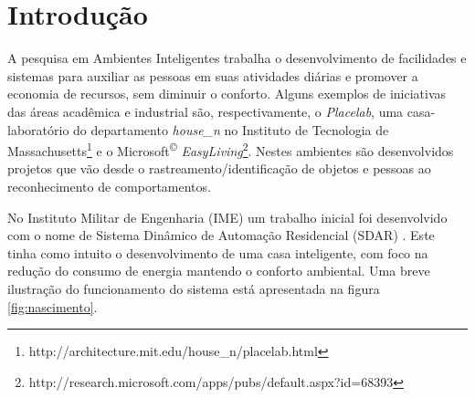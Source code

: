 \newpage

\section{Introdução} \label{intro}

A pesquisa em Ambientes Inteligentes trabalha o desenvolvimento de facilidades e sistemas para  auxiliar as pessoas em suas atividades diárias e promover a economia de recursos, sem diminuir o conforto. Alguns exemplos de iniciativas das áreas acadêmica e industrial são, respectivamente, o \textit{Placelab}, uma casa-laboratório do departamento \textit{house\_n} no Instituto de Tecnologia de Massachusetts\footnote{http://architecture.mit.edu/house\_n/placelab.html} e o Microsoft\textsuperscript{©} \textit{EasyLiving}\footnote{http://research.microsoft.com/apps/pubs/default.aspx?id=68393}. Nestes ambientes são desenvolvidos projetos que vão desde o rastreamento/identificação de objetos e pessoas ao reconhecimento de comportamentos.

%

No Instituto Militar de Engenharia (IME) um trabalho inicial foi desenvolvido com o nome de Sistema Dinâmico de Automação Residencial (SDAR) \cite{Nascimento2002}. Este tinha como intuito o desenvolvimento de uma casa inteligente, com foco na redução do consumo de energia mantendo o conforto ambiental. Uma breve ilustração do funcionamento do sistema está apresentada na figura \ref{fig:nascimento}.%


